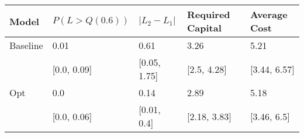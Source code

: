 \begin{tabular}{lllll}
\toprule
   Model & $P(L > Q(0.6))$ & $|L_2 - L_1|$ & Required Capital & Average Cost \\
\midrule
Baseline &            0.01 &          0.61 &             3.26 &         5.21 \\
         &     [0.0, 0.09] &  [0.05, 1.75] &      [2.5, 4.28] & [3.44, 6.57] \\
     Opt &             0.0 &          0.14 &             2.89 &         5.18 \\
         &     [0.0, 0.06] &   [0.01, 0.4] &     [2.18, 3.83] &  [3.46, 6.5] \\
\bottomrule
\end{tabular}
